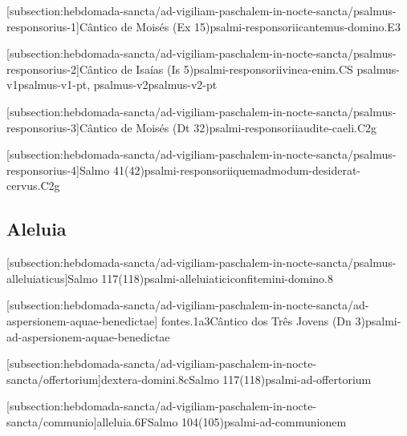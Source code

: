 \def\Prefix{subsection:hebdomada-sancta/ad-vigiliam-paschalem-in-nocte-sancta}

[\Prefix/psalmus-responsorius-1]{Cântico de Moisés (Ex 15)}{psalmi-responsorii}{cantemus-domino.E3}

\AllowPageFlush

[\Prefix/psalmus-responsorius-2]{Cântico de Isaías (Is 5)}{psalmi-responsorii}{vinea-enim.CS}{
  {psalmus-v1}{psalmus-v1-pt},
  {psalmus-v2}{psalmus-v2-pt}
}

[\Prefix/psalmus-responsorius-3]{Cântico de Moisés (Dt 32)}{psalmi-responsorii}{audite-caeli.C2g}

\AllowPageFlush

[\Prefix/psalmus-responsorius-4]{Salmo 41(42)}{psalmi-responsorii}{quemadmodum-desiderat-cervus.C2g}

\AllowPageFlush

\subsection{Aleluia}\label{\Prefix/alleluia}

[\Prefix/psalmus-alleluiaticus]{Salmo 117(118)}{psalmi-alleluiatici}{confitemini-domino.8}

\AllowPageFlush


[\Prefix/ad-aspersionem-aquae-benedictae]
{fontes.1a3}{Cântico dos Três Jovens (Dn 3)}{psalmi-ad-aspersionem-aquae-benedictae}

\AllowPageFlush

[\Prefix/offertorium]{dextera-domini.8c}{Salmo 117(118)}{psalmi-ad-offertorium}

\AllowPageFlush

[\Prefix/communio]{alleluia.6F}{Salmo 104(105)}{psalmi-ad-communionem}